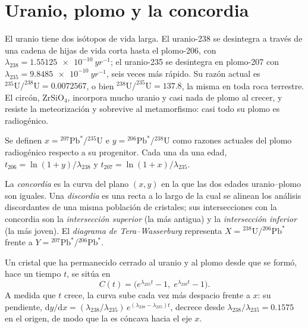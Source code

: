 \section{Uranio, plomo y la concordia}\label{sec:b3:advanced-geochronology:upb}

El uranio tiene dos isótopos de vida larga. El uranio-238 se desintegra a través de una cadena de
hijas de vida corta hasta el plomo-206, con $\lambda_{238} =
\qty{1.55125e-10}{yr^{-1}}$; el uranio-235 se desintegra en plomo-207 con $\lambda_{235}
= \qty{9.8485e-10}{yr^{-1}}$, seis veces más rápido. Su razón actual es
$^{235}\mathrm{U}/^{238}\mathrm{U} = 0.0072567$, o bien $^{238}\mathrm{U}/^{235}\mathrm{U}
= 137.8$, la misma en toda roca terrestre. El circón, $\mathrm{ZrSiO_4}$, incorpora
mucho uranio y casi nada de plomo al crecer, y resiste la meteorización
y sobrevive al metamorfismo: casi todo su plomo es radiogénico.

Se definen $x = {}^{207}\mathrm{Pb}^*/{}^{235}\mathrm{U}$ e $y =
{}^{206}\mathrm{Pb}^*/{}^{238}\mathrm{U}$ como razones actuales del plomo radiogénico
respecto a su progenitor. Cada una da una edad, $t_{206} = \ln(1 + y)/\lambda_{238}$
y $t_{207} = \ln(1 + x)/\lambda_{235}$.

\begin{definition}
\label{def:b3:advanced-geochronology:concordia}
La \emph{concordia} es la curva del plano $(x, y)$ en la que
las dos edades uranio--plomo son iguales. Una \emph{discordia}
es una recta a lo largo de la cual se alinean los análisis discordantes de una misma población de
cristales; sus intersecciones con la concordia son la
\emph{intersección superior} (la más antigua) y la
\emph{intersección inferior} (la más joven). El
\emph{diagrama de Tera--Wasserburg} representa
$X = {}^{238}\mathrm{U}/{}^{206}\mathrm{Pb}^*$ frente a $Y =
{}^{207}\mathrm{Pb}^*/{}^{206}\mathrm{Pb}^*$.
\end{definition}

\begin{theorem}[La concordia]\label{thm:b3:advanced-geochronology:concordia}
Un cristal que ha permanecido cerrado al uranio y al plomo desde que se formó, hace
un tiempo $t$, se sitúa en
\[
C(t) = \bigl(e^{\lambda_{235}t} - 1,\; e^{\lambda_{238}t} - 1\bigr).
\]
A medida que $t$ crece, la curva sube cada vez más despacio frente a $x$: su pendiente,
$\mathrm dy/\mathrm dx = (\lambda_{238}/\lambda_{235})\,e^{(\lambda_{238} -
\lambda_{235})t}$, decrece desde $\lambda_{238}/\lambda_{235} = 0.1575$ en el
origen, de modo que la  es cóncava hacia el eje $x$.
\end{theorem}

